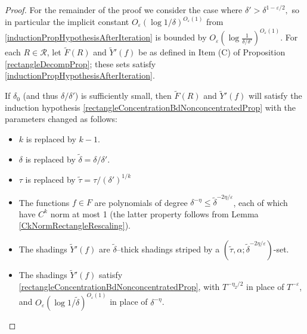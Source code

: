 \documentclass[letterpaper, reqno,11pt]{article}
\numberwithin{equation}{section}
\newcommand{\eps}{\varepsilon}
\numberwithin{thm}{section}
\theoremstyle{remark}
\begin{document}
\begin{proof}
For the remainder of the proof we consider the case where $\delta'>\delta^{1-\eps/2},$ so in particular the implicit constant $O_{\eps}(\log 1/\delta)^{O_\eps(1)}$ from \eqref{inductionPropHypothesisAfterIteration} is bounded by $O_{\eps}(\log \frac{1}{\delta/\delta'})^{O_\eps(1)}$. For each $R\in\mathcal{R}$, let $\tilde F(R)$ and $\tilde Y'(f)$ be as defined in Item (C) of Proposition \ref{rectangleDecompProp}; these sets satisfy \eqref{inductionPropHypothesisAfterIteration}.

If $\delta_0$ (and thus $\delta/\delta'$) is sufficiently small, then $\tilde F(R)$ and $\tilde Y'(f)$ will satisfy the induction hypothesis \eqref{rectangleConcentrationBdNonconcentratedProp} with the parameters changed as follows:
\begin{itemize}
\item $k$ is replaced by $k-1$.
\item $\delta$ is replaced by $\tilde\delta = \delta/\delta'$.
\item $\tau$ is replaced by $\tilde\tau = \tau/(\delta')^{1/k}$
\item The functions $f\in F$ are polynomials of degree $\delta^{-\eta} \leq \tilde\delta^{-2\eta/\eps}$, each of which have $C^k$ norm at most 1 (the latter property follows from Lemma \ref{CkNormRectangleRescaling}).
\item The shadings $\tilde Y'(f)$ are $\tilde\delta$--thick shadings striped by a $(\tilde\tau,\alpha;\tilde\delta^{-2\eta/\eps})$-set.
\item The shadings $\tilde Y'(f)$ satisfy \eqref{rectangleConcentrationBdNonconcentratedProp}, with $T^{-\eta_2/2}$ in place of $T^{-\eps}$, and $O_{\eps}(\log 1/\tilde\delta)^{O_\eps(1)}$ in place of $\delta^{-\eta}$.
\end{itemize}


\end{proof}
\end{document}
